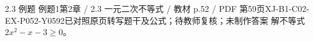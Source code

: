 \par\noindent\begin{minipage}{\linewidth}
\begin{bankitem}{2.3 例题 例题1}{第2章 / 2.3 一元二次不等式 / 教材 p.52 / PDF 第59页}{XJ-B1-C02-EX-P052-Y0592}{已对照原页转写题干及公式；待教师复核；未制作答案}
解不等式 $2x^2-x-3\ge0$。
\end{bankitem}
\end{minipage}\par\medskip
